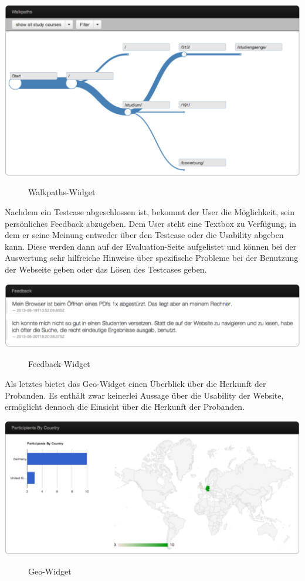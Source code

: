 \begin{center}
\includegraphics[scale=0.45]{./images/walkpathsWidget}
\end{center}
\begin{figure}[htb]
   \centering
   \caption{Walkpaths-Widget}
    \label{walkpathsWidget}
\end{figure}

Nachdem ein Testcase abgeschlossen ist, bekommt der User die Möglichkeit, sein persönliches Feedback abzugeben. Dem User steht eine Textbox zu Verfügung, in dem er seine Meinung entweder über den Testcase oder die Usability abgeben kann. Diese werden dann auf der Evaluation-Seite aufgelistet und können bei der Auswertung sehr hilfreiche Hinweise über spezifische Probleme bei der Benutzung der Webseite geben oder das Lösen des Testcases geben.

\begin{center}
\includegraphics[scale=0.45]{./images/feedbackWidget}
\end{center}
\begin{figure}[htb]
   \centering
   \caption{Feedback-Widget}
    \label{feedbackWidget}
\end{figure}

Als letztes bietet das Geo-Widget einen Überblick über die Herkunft der Probanden. Es enthält zwar keinerlei Aussage über die Usability der Website, ermöglicht dennoch die Einsicht über die Herkunft der Probanden.

\begin{center}
\includegraphics[scale=0.45]{./images/geoWidget}
\end{center}
\begin{figure}[htb]
   \centering
   \caption{Geo-Widget}
    \label{geoWidget}
\end{figure}